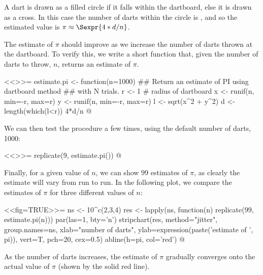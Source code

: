 \documentclass[12pt]{article}
\begin{document}
A dart is drawn as a filled circle if it falls within the dartboard,
else it is drawn as a cross.  In this case the number of darts within
the circle is , and so the estimated value is $\pi \approx
\Sexpr{4*d/n}$.


The estimate of $\pi$ should improve as we increase the number of darts
thrown at the dartboard.  To verify this, we write a short function
that, given the number of darts to throw, $n$, returns an estimate of
$\pi$.  

<<>>=
estimate.pi <- function(n=1000) {
  ## Return an estimate of PI using dartboard method
  ## with N trials.
  r <- 1                                # radius of dartboard
  x <- runif(n, min=-r, max=r)
  y <- runif(n, min=-r, max=r)
  l <- sqrt(x^2 + y^2)
  d <- length(which(l<r))
  4*d/n
}
@ 

We can then test the procedure a few times, using the default number
of darts, 1000:

<<>>=
replicate(9, estimate.pi())
@ 

Finally, for a given value of $n$, we can show 99 estimates of $\pi$,
as clearly the estimate will vary from run to run.  In the following
plot, we compare the estimates of $\pi$ for three different values of $n$:

\begin{center}
<<fig=TRUE>>=
ns <- 10^c(2,3,4)
res <- lapply(ns, function(n) replicate(99, estimate.pi(n)))
par(las=1, bty='n')
stripchart(res, method="jitter", group.names=ns, 
           xlab="number of darts",
           ylab=expression(paste('estimate of ', pi)),
           vert=T, pch=20, cex=0.5)
abline(h=pi, col='red')
@ 
\end{center}

As the number of darts increases, the estimate of $\pi$ gradually
converges onto the actual value of $\pi$ (shown by the solid red line).
\end{document}
